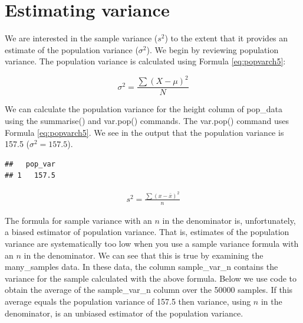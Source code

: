 \documentclass[
]{krantz}
\makeatletter
\newenvironment{Shaded}{\begin{snugshade}}{\end{snugshade}}
\newcommand{\DataTypeTok}[1]{\textcolor[rgb]{0.27,0.27,0.27}{#1}}
\newcommand{\KeywordTok}[1]{\textcolor[rgb]{0.27,0.27,0.27}{\textbf{#1}}}
\newcommand{\NormalTok}[1]{#1}
\newcommand{\OperatorTok}[1]{\textcolor[rgb]{0.43,0.43,0.43}{\textbf{#1}}}
\newcommand{\StringTok}[1]{\textcolor[rgb]{0.5,0.5,0.5}{#1}}
\newenvironment{kframe}{%
\medskip{}
\setlength{\fboxsep}{.8em}
 \def\at@end@of@kframe{}%
 \ifinner\ifhmode%
  \def\at@end@of@kframe{\end{minipage}}%
  \begin{minipage}{\columnwidth}%
 \fi\fi%
 \def\FrameCommand##1{\hskip\@totalleftmargin \hskip-\fboxsep
 \colorbox{shadecolor}{##1}\hskip-\fboxsep
     \hskip-\linewidth \hskip-\@totalleftmargin \hskip\columnwidth}%
 \MakeFramed {\advance\hsize-\width
   \@totalleftmargin\z@ \linewidth\hsize
   \@setminipage}}%
 {\par\unskip\endMakeFramed%
 \at@end@of@kframe}
\renewenvironment{Shaded}{\begin{kframe}}{\end{kframe}}
\makeatother
\begin{document}
\hypertarget{estimating-variance}{%
\section{Estimating variance}\label{estimating-variance}}

We are interested in the sample variance (\(s^2\)) to the extent that it provides an estimate of the population variance (\(\sigma^2\)). We begin by reviewing population variance. The population variance is calculated using Formula \eqref{eq:popvarch5}:

\begin{equation} 
\sigma^2 = \frac{\sum{(X - \mu)^2}}{N}
      \label{eq:popvarch5}
\end{equation}

We can calculate the population variance for the height column of pop\_data using the summarise() and var.pop() commands. The var.pop() command uses Formula \eqref{eq:popvarch5}. We see in the output that the population variance is 157.5 (\(\sigma^2 = 157.5\)).

\begin{Shaded}
\end{Shaded}

\begin{verbatim}
##   pop_var
## 1   157.5
\end{verbatim}

\[
\begin{aligned} 
s^2 = \frac{\sum{(x - \bar{x})^2}}{n}
\end{aligned} 
\]

The formula for sample variance with an \(n\) in the denominator is, unfortunately, a biased estimator of population variance. That is, estimates of the population variance are systematically too low when you use a sample variance formula with an \(n\) in the denominator. We can see that this is true by examining the many\_samples data. In these data, the column sample\_var\_n contains the variance for the sample calculated with the above formula. Below we use code to obtain the average of the sample\_var\_n column over the 50000 samples. If this average equals the population variance of 157.5 then variance, using \(n\) in the denominator, is an unbiased estimator of the population variance.
\end{document}
